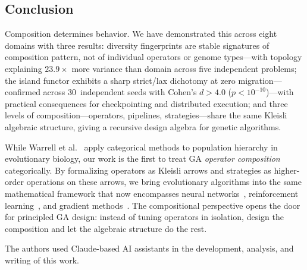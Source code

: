 \documentclass[sigconf]{acmart}
\begin{document}
\subsection{Conclusion}

Composition determines behavior. We have demonstrated this across eight domains with three results: diversity fingerprints are stable signatures of composition pattern, not of individual operators or genome types---with topology explaining $23.9\times$ more variance than domain across five independent problems; the island functor exhibits a sharp strict/lax dichotomy at zero migration---confirmed across 30~independent seeds with Cohen's $d > 4.0$ ($p < 10^{-10}$)---with practical consequences for checkpointing and distributed execution; and three levels of composition---operators, pipelines, strategies---share the same Kleisli algebraic structure, giving a recursive design algebra for genetic algorithms.

While Warrell et al.~\cite{warrell2024kantorovich} apply categorical methods to population hierarchy in evolutionary biology, our work is the first to treat GA \emph{operator composition} categorically. By formalizing operators as Kleisli arrows and strategies as higher-order operations on these arrows, we bring evolutionary algorithms into the same mathematical framework that now encompasses neural networks~\cite{gavranovic2024categorical}, reinforcement learning~\cite{bakirtzis2024compositional, hedges2024reinforcement}, and gradient methods~\cite{hanks2024gradient}. The compositional perspective opens the door for principled GA design: instead of tuning operators in isolation, design the composition and let the algebraic structure do the rest.

\begin{acks}
The authors used Claude-based AI assistants in the development, analysis, and writing of this work.
\end{acks}



\end{document}
